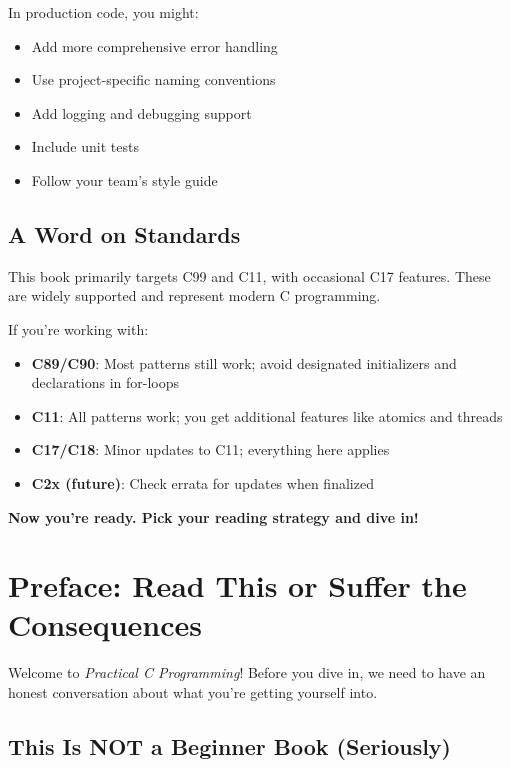 \documentclass[10pt,openany]{book}
\begin{document}
In production code, you might:
\begin{itemize}
    \item Add more comprehensive error handling
    \item Use project-specific naming conventions
    \item Add logging and debugging support
    \item Include unit tests
    \item Follow your team's style guide
\end{itemize}

\section*{A Word on Standards}

This book primarily targets C99 and C11, with occasional C17 features. These are widely supported and represent modern C programming.

If you're working with:
\begin{itemize}
    \item \textbf{C89/C90}: Most patterns still work; avoid designated initializers and declarations in for-loops
    \item \textbf{C11}: All patterns work; you get additional features like atomics and threads
    \item \textbf{C17/C18}: Minor updates to C11; everything here applies
    \item \textbf{C2x (future)}: Check errata for updates when finalized
\end{itemize}

\vspace{2em}

\textbf{Now you're ready. Pick your reading strategy and dive in!}

\clearpage

\chapter{Preface: Read This or Suffer the Consequences}

Welcome to \textit{Practical C Programming}! Before you dive in, we need to have an honest conversation about what you're getting yourself into.

\section*{This Is NOT a Beginner Book (Seriously)}
\end{document}
